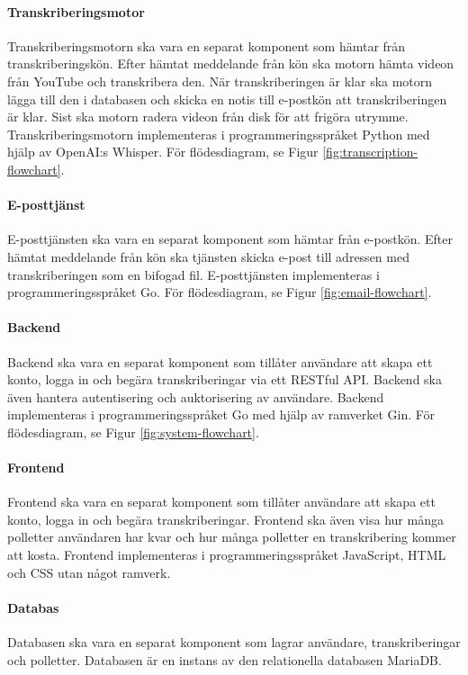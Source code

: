 \paragraph{Transkriberingsmotor}
Transkriberingsmotorn ska vara en separat komponent som hämtar från
transkriberingskön. Efter hämtat meddelande från kön ska motorn hämta videon
från YouTube och transkribera den. När transkriberingen är klar ska motorn
lägga till den i databasen och skicka en notis till e-postkön att
transkriberingen är klar. Sist ska motorn radera videon från disk för att
frigöra utrymme. Transkriberingsmotorn implementeras i programmeringsspråket
Python med hjälp av OpenAI:s Whisper. För flödesdiagram, se Figur \ref{fig:transcription-flowchart}.

\paragraph{E-posttjänst}
E-posttjänsten ska vara en separat komponent som hämtar från e-postkön. Efter
hämtat meddelande från kön ska tjänsten skicka e-post till adressen med
transkriberingen som en bifogad fil. E-posttjänsten implementeras i 
programmeringsspråket Go. För flödesdiagram, se Figur \ref{fig:email-flowchart}.

\paragraph{Backend}
Backend ska vara en separat komponent som tillåter användare att skapa ett
konto, logga in och begära transkriberingar via ett RESTful API. Backend ska
även hantera autentisering och auktorisering av användare. Backend implementeras
i programmeringsspråket Go med hjälp av ramverket Gin. För flödesdiagram, se Figur \ref{fig:system-flowchart}.

\paragraph{Frontend}
Frontend ska vara en separat komponent som tillåter användare att skapa ett
konto, logga in och begära transkriberingar. Frontend ska även visa hur
många polletter användaren har kvar och hur många polletter en transkribering
kommer att kosta. Frontend implementeras i programmeringsspråket JavaScript,
HTML och CSS utan något ramverk.

\paragraph{Databas}
Databasen ska vara en separat komponent som lagrar användare, transkriberingar
och polletter. Databasen är en instans av den relationella databasen MariaDB.

